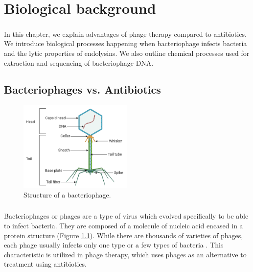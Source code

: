 \chapter{Biological background}

\label{kap:background} %
\paragraph*{}
In this chapter, we explain advantages of phage therapy compared to antibiotics. We introduce biological processes happening when bacteriophage infects bacteria and the lytic properties of endolysins. We also outline chemical processes used for extraction and sequencing of bacteriophage DNA.

\section{Bacteriophages vs. Antibiotics}

\begin{figure}[h]
  \begin{center}
     \includegraphics[width=0.5\textwidth]{images/bacteriophage.png}
     \caption{Structure of a bacteriophage.}\label{fig:phage}
  \end{center}
\end{figure} 

\paragraph*{}
Bacteriophages or phages are a type of virus which evolved specifically to be able to infect bacteria. They are composed of a molecule of nucleic acid encased in a protein structure (Figure \ref{fig:phage}). While there are thousands of varieties of phages, each phage usually infects only one type or a few types of bacteria \cite{guttman2005basic}. This characteristic is utilized in phage therapy, which uses phages as an alternative to treatment using antibiotics. 

